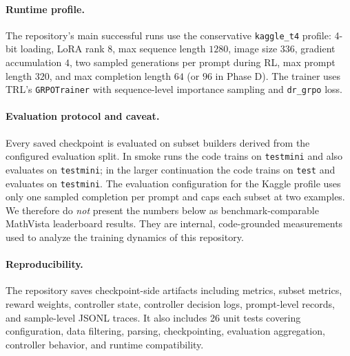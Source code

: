 \documentclass{article} %
\begin{document}
\paragraph{Runtime profile.}
The repository's main successful runs use the conservative \texttt{kaggle\_t4} profile: 4-bit loading, LoRA rank $8$, max sequence length $1280$, image size $336$, gradient accumulation $4$, two sampled generations per prompt during RL, max prompt length $320$, and max completion length $64$ (or $96$ in Phase D). The trainer uses TRL's \texttt{GRPOTrainer} with sequence-level importance sampling and \texttt{dr\_grpo} loss.

\paragraph{Evaluation protocol and caveat.}
Every saved checkpoint is evaluated on subset builders derived from the configured evaluation split. In smoke runs the code trains on \texttt{testmini} and also evaluates on \texttt{testmini}; in the larger continuation the code trains on \texttt{test} and evaluates on \texttt{testmini}. The evaluation configuration for the Kaggle profile uses only one sampled completion per prompt and caps each subset at two examples. We therefore do \emph{not} present the numbers below as benchmark-comparable MathVista leaderboard results. They are internal, code-grounded measurements used to analyze the training dynamics of this repository.

\paragraph{Reproducibility.}
The repository saves checkpoint-side artifacts including metrics, subset metrics, reward weights, controller state, controller decision logs, prompt-level records, and sample-level JSONL traces. It also includes 26 unit tests covering configuration, data filtering, parsing, checkpointing, evaluation aggregation, controller behavior, and runtime compatibility.
\end{document}
